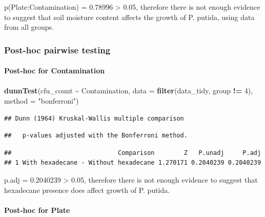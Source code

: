 \documentclass[
]{article}
\newenvironment{Shaded}{\begin{snugshade}}{\end{snugshade}}
\newcommand{\AttributeTok}[1]{\textcolor[rgb]{0.13,0.29,0.53}{#1}}
\newcommand{\DecValTok}[1]{\textcolor[rgb]{0.00,0.00,0.81}{#1}}
\newcommand{\FunctionTok}[1]{\textcolor[rgb]{0.13,0.29,0.53}{\textbf{#1}}}
\newcommand{\NormalTok}[1]{#1}
\newcommand{\SpecialCharTok}[1]{\textcolor[rgb]{0.81,0.36,0.00}{\textbf{#1}}}
\newcommand{\StringTok}[1]{\textcolor[rgb]{0.31,0.60,0.02}{#1}}
\begin{document}
p(Plate:Contamination) = 0.78996 \textgreater{} 0.05, therefore there is
not enough evidence to suggest that soil moisture content affects the
growth of P. putida, using data from all groups.

\subsubsection{Post-hoc pairwise
testing}\label{post-hoc-pairwise-testing}

\paragraph{Post-hoc for Contamination}\label{post-hoc-for-contamination}

\paragraph{}\label{section}

\begin{Shaded}
\begin{Highlighting}[]
\FunctionTok{dunnTest}\NormalTok{(cfu\_count }\SpecialCharTok{\textasciitilde{}}\NormalTok{ Contamination, }\AttributeTok{data =} \FunctionTok{filter}\NormalTok{(data\_tidy, group }\SpecialCharTok{!=} \DecValTok{4}\NormalTok{), }\AttributeTok{method =} \StringTok{"bonferroni"}\NormalTok{)}
\end{Highlighting}
\end{Shaded}

\begin{verbatim}
## Dunn (1964) Kruskal-Wallis multiple comparison
\end{verbatim}

\begin{verbatim}
##   p-values adjusted with the Bonferroni method.
\end{verbatim}

\begin{verbatim}
##                             Comparison        Z   P.unadj     P.adj
## 1 With hexadecane - Without hexadecane 1.270171 0.2040239 0.2040239
\end{verbatim}

p.adj = 0.2040239 \textgreater{} 0.05, therefore there is not enough
evidence to suggest that hexadecane presence does affect growth of P.
putida.

\paragraph{Post-hoc for Plate}\label{post-hoc-for-plate}
\end{document}

